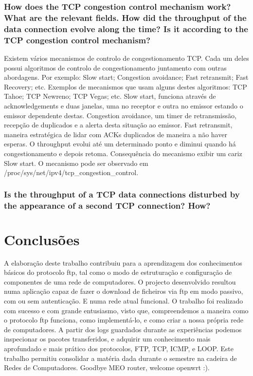 \documentclass[a4paper]{article}
\begin{document}
\subsubsection{How does the TCP congestion control mechanism work? What are the
relevant fields. How did the throughput of the data connection evolve
along the time? Is it according to the TCP congestion control mechanism?}
Existem vários mecanismos de controlo de congestionamento TCP. Cada um deles possui algoritmos de controlo de congestionamento juntamento com outras abordagens. Por exemplo: Slow start; Congestion avoidance; Fast retransmit; Fast Recovery; etc. Exemplos de mecanismos que usam alguns destes algoritmos: TCP Tahoe; TCP Newreno; TCP Vegas; etc. Slow start, funciona através de acknowledgements e duas janelas, uma no receptor e outra no emissor estando o emissor dependente destas. Congestion avoidance, um timer de retransmissão, recepção de duplicados e a alerta desta situação ao emissor. Fast retransmit, maneira estratégica de lidar com ACKs duplicados de maneira a não haver esperas. O throughput evolui até um determinado ponto e diminui quando há congestionamento e depois retoma. Consequência do mecanismo exibir um cariz Slow start. O mecanismo pode ser observado em /proc/sys/net/ipv4/tcp\_congestion\_control.

\subsubsection{Is the throughput of a TCP data connections disturbed by the appearance of a second TCP connection? How?}

\section{Conclusões}
A elaboração deste trabalho contribuiu para a aprendizagem dos conhecimentos
básicos do protocolo ftp, tal como o modo de estruturação e configuração de
componentes de uma rede de computadores. O projecto  desenvolvido resultou numa
aplicação capaz de fazer o download de ficheiros via ftp em modo passivo, com
ou sem autenticação. E numa rede atual funcional. O trabalho foi realizado com
sucesso e com grande entusiasmo, visto que, compreendemos a maneira como o
protocolo ftp funciona, como implementá-lo, e como criar a nossa própria rede de
computadores. A partir dos logs guardados durante as experiências podemos inspecionar
os pacotes transferidos, e adquirir um conhecimento mais aprofundado e mais prático dos protocolos,
FTP, TCP, ICMP, e LOOP. Este trabalho permitiu consolidar a matéria dada durante o semestre na cadeira
de Redes de Computadores. Goodbye MEO router, welcome openwrt :).
\end{document}
